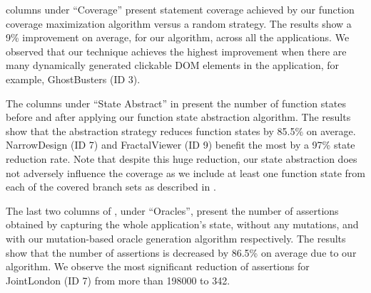  columns under ``Coverage'' present \javascript statement coverage achieved by  our function coverage maximization algorithm versus a random strategy. The results show a 9\% improvement on average, for our algorithm, across all the applications. We observed that our technique achieves the highest improvement when there are many dynamically generated clickable DOM elements in the application, for example, GhostBusters (ID 3). 

The columns under ``State Abstract'' in  present the number of function states
before and after applying our function state abstraction algorithm.   
The results show that the abstraction strategy reduces function states by 85.5\% on average. NarrowDesign (ID 7) and FractalViewer (ID 9) benefit the most by a 97\% state reduction rate. 
Note that despite this huge reduction, our state abstraction does not adversely influence the coverage as we include at least one function state from each of the covered branch sets as described in .

The last two columns of , under ``Oracles'', present the number of assertions obtained by capturing the whole application's state,  without any mutations, and with our mutation-based oracle generation algorithm respectively. The results show that the number of assertions is decreased by 86.5\% on average due to 
our algorithm. 
We observe the most significant reduction of assertions for JointLondon (ID 7) from more than 198000 to 342. 





